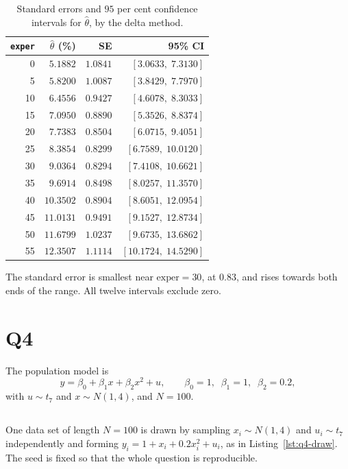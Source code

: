 \documentclass[11pt]{article}
\newcommand{\code}[1]{\texttt{#1}}
\begin{document}
\begin{table}[htbp]
\centering
\caption{Standard errors and $95$ per cent confidence intervals for
$\hat\theta$, by the delta method.}
\label{tab:q3-ci}
\small
\begin{tabular}{rrrr}
\toprule
\code{exper} & $\hat\theta$ (\%) & SE & 95\% CI \\
\midrule
 0 & $5.1882$ & $1.0841$ & $[3.0633,\; 7.3130]$ \\
 5 & $5.8200$ & $1.0087$ & $[3.8429,\; 7.7970]$ \\
10 & $6.4556$ & $0.9427$ & $[4.6078,\; 8.3033]$ \\
15 & $7.0950$ & $0.8890$ & $[5.3526,\; 8.8374]$ \\
20 & $7.7383$ & $0.8504$ & $[6.0715,\; 9.4051]$ \\
25 & $8.3854$ & $0.8299$ & $[6.7589,\; 10.0120]$ \\
30 & $9.0364$ & $0.8294$ & $[7.4108,\; 10.6621]$ \\
35 & $9.6914$ & $0.8498$ & $[8.0257,\; 11.3570]$ \\
40 & $10.3502$ & $0.8904$ & $[8.6051,\; 12.0954]$ \\
45 & $11.0131$ & $0.9491$ & $[9.1527,\; 12.8734]$ \\
50 & $11.6799$ & $1.0237$ & $[9.6735,\; 13.6862]$ \\
55 & $12.3507$ & $1.1114$ & $[10.1724,\; 14.5290]$ \\
\bottomrule
\end{tabular}
\end{table}

The standard error is smallest near $\text{exper} = 30$, at $0.83$, and rises
towards both ends of the range. All twelve intervals exclude zero.

\clearpage
\section{Q4}
\label{sec:q4}

The population model is
\[
y = \beta_0 + \beta_1 x + \beta_2 x^2 + u,
\qquad
\beta_0 = 1,\;\; \beta_1 = 1,\;\; \beta_2 = 0.2,
\]
with $u \sim t_7$ and $x \sim N(1,4)$, and $N = 100$.

\subsection{}
One data set of length $N = 100$ is drawn by sampling $x_i \sim N(1,4)$ and
$u_i \sim t_7$ independently and forming
$y_i = 1 + x_i + 0.2x_i^2 + u_i$, as in Listing~\ref{lst:q4-draw}. The seed is
fixed so that the whole question is reproducible.
\end{document}
